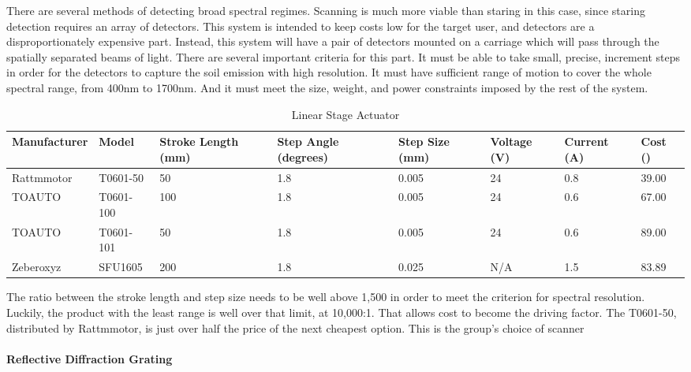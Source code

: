 There are several methods of detecting broad spectral regimes. Scanning is much more viable than staring in this case, since staring detection requires an array of detectors. This system is intended to keep costs low for the target user, and detectors are a disproportionately expensive part. Instead, this system will have a pair of detectors mounted on a carriage which will pass through the spatially separated beams of light. There are several important criteria for this part. It must be able to take small, precise, increment steps in order for the detectors to capture the soil emission with high resolution. It must have sufficient range of motion to cover the whole spectral range, from 400nm to 1700nm. And it must meet the size, weight, and power constraints imposed by the rest of the system. 


\begin{table}[H]
	\centering
	\label{table:LinearStageActuators}
	\caption{Linear Stage Actuator}
	\bigskip
	\begin{tabular}{|p{2.5cm}|p{1.5cm}|p{1.25cm}|p{1.75cm}|p{1cm}|p{1.25cm}|p{1.25cm}|p{1cm}|}
	\hline
	Manufacturer & Model & Stroke Length (mm) & Step Angle (degrees) & Step Size (mm) & Voltage (V) & Current (A) & Cost (\textdollar)\\
	\hline
	Rattmmotor & T0601-50 & 50 & 1.8 & 0.005 & 24 & 0.8 & 39.00\\
	\hline
	TOAUTO & T0601-100 & 100 & 1.8 & 0.005 & 24 & 0.6 & 67.00\\
	\hline
	TOAUTO & T0601-101 & 50 & 1.8 & 0.005 & 24 & 0.6 & 89.00\\
	\hline
	Zeberoxyz & SFU1605 & 200 & 1.8 & 0.025 & N/A & 1.5 & 83.89\\
	\hline
	\end{tabular}
\end{table}

The ratio between the stroke length and step size needs to be well above 1,500 in order to meet the criterion for spectral resolution. Luckily, the product with the least range is well over that limit, at 10,000:1. That allows cost to become the driving factor. The T0601-50, distributed by Rattmmotor, is just over half the price of the next cheapest option. This is the group’s choice of scanner


\paragraph{Reflective Diffraction Grating}


